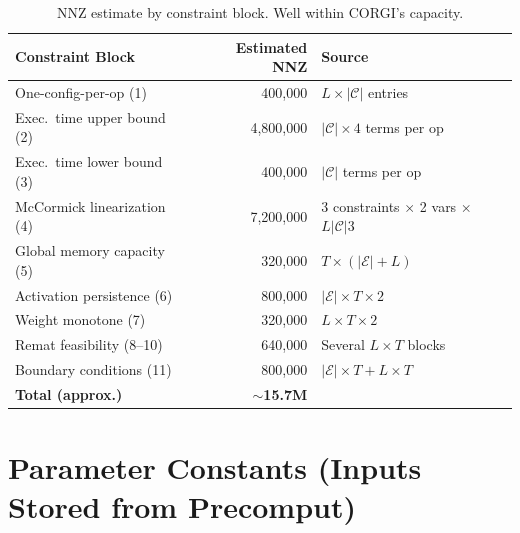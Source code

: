 \documentclass{article}
\begin{document}
\begin{table}[h!]
\centering
\begin{tabular}{lrl}
\toprule
\textbf{Constraint Block} & \textbf{Estimated NNZ} & \textbf{Source} \\
\midrule
One-config-per-op (1)           & 400,000      & $L \times |\mathcal{C}|$ entries \\
Exec.\ time upper bound (2)     & 4,800,000    & $|\mathcal{C}| \times 4$ terms per op \\
Exec.\ time lower bound (3)     & 400,000      & $|\mathcal{C}|$ terms per op \\
McCormick linearization (4)     & 7,200,000    & 3 constraints $\times$ 2 vars $\times$ $L|\mathcal{C}|3$ \\
Global memory capacity (5)      & 320,000      & $T \times (|\mathcal{E}| + L)$ \\
Activation persistence (6)      & 800,000      & $|\mathcal{E}| \times T \times 2$ \\
Weight monotone (7)             & 320,000      & $L \times T \times 2$ \\
Remat feasibility (8--10)       & 640,000      & Several $L \times T$ blocks \\
Boundary conditions (11)        & 800,000      & $|\mathcal{E}| \times T + L \times T$ \\
\midrule
\textbf{Total (approx.)}        & \textbf{$\sim$15.7M} & \\
\bottomrule
\end{tabular}
\caption{NNZ estimate by constraint block. Well within CORGI's capacity.}
\end{table}

\section{Parameter Constants (Inputs Stored from Precomput)}
\end{document}
